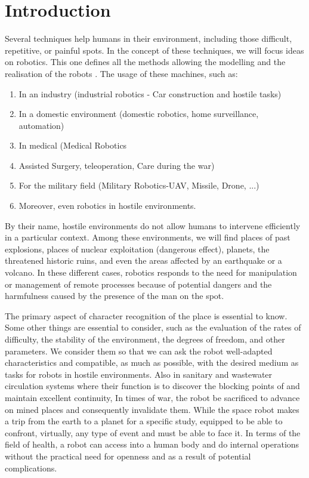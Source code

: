 \documentclass[Afour,sageh,times]{sagej}
\begin{document}
\section{Introduction}
Several techniques help humans in their environment, including those difficult, repetitive, or painful spots. In the concept of these techniques, we will focus ideas on robotics. This one defines all the methods allowing the modelling and the realisation of the robots \citep{Krichmar2001}. The usage of these machines, such as:
\begin{enumerate}
    \item In an industry (industrial robotics - Car construction and hostile tasks)
    \item In a domestic environment (domestic robotics, home surveillance, automation)
    \item In medical (Medical Robotics
    \item Assisted Surgery, teleoperation, Care during the war)
    \item For the military field (Military Robotics-UAV, Missile, Drone, ...)
    \item Moreover, even robotics in hostile environments.
\end{enumerate}
By their name, hostile environments do not allow humans to intervene efficiently in a particular context. Among these environments, we will find places of past explosions, places of nuclear exploitation (dangerous effect), planets, the threatened historic ruins, and even the areas affected by an earthquake or a volcano. In these different cases, robotics responds to the need \citep{Yahya2017} for manipulation or management of remote processes because of potential dangers and the harmfulness caused by the presence of the man on the spot.

The primary aspect of character recognition of the place is essential to know. Some other things are essential to consider, such as the evaluation of the rates of difficulty, the stability of the environment, the degrees of freedom, and other parameters. We consider them so that we can ask the robot well-adapted characteristics and compatible, as much as possible, with the desired medium as tasks for robots in hostile environments. Also in sanitary and wastewater circulation systems where their function is to discover the blocking points of and maintain excellent continuity, In times of war, the robot be sacrificed to advance on mined places and consequently invalidate them. While the space robot makes a trip from the earth to a planet for a specific study, equipped to be able to confront, virtually, any type of event and must be able to face it. In terms of the field of health, a robot can access into a human body and do internal operations without the practical need for openness and as a result of potential complications.
\end{document}
